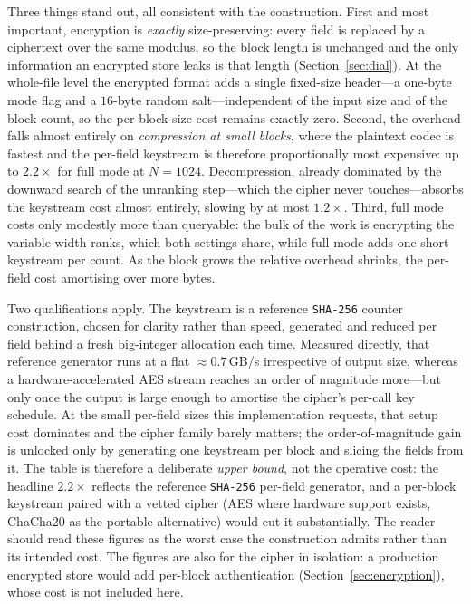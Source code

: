 \documentclass[entropy,article,submit,oneauthor,pdftex]{Definitions/mdpi}
\begin{document}
Three things stand out, all consistent with the construction. First and most
important, encryption is \emph{exactly} size-preserving: every field is replaced by a
ciphertext over the same modulus, so the block length is unchanged and the only
information an encrypted store leaks is that length
(Section~\ref{sec:dial}). At the whole-file level the encrypted format adds a single
fixed-size header---a one-byte mode flag and a $16$-byte random salt---independent of
the input size and of the block count, so the per-block size cost remains exactly
zero. Second, the overhead falls almost entirely on
\emph{compression at small blocks}, where the plaintext codec is fastest and the
per-field keystream is therefore proportionally most expensive: up to $2.2\times$ for
full mode at $N{=}1024$. Decompression, already dominated by the downward search of
the unranking step---which the cipher never touches---absorbs the keystream cost
almost entirely, slowing by at most $1.2\times$. Third, full mode costs only modestly
more than queryable: the bulk of the work is encrypting the variable-width ranks,
which both settings share, while full mode adds one short keystream per count. As the
block grows the relative overhead shrinks, the per-field cost amortising over more
bytes.

Two qualifications apply. The keystream is a reference \texttt{SHA-256}
counter construction, chosen for clarity rather than speed, generated and reduced
per field behind a fresh big-integer allocation each time. Measured directly, that
reference generator runs at a flat ${\approx}0.7$\,GB/s irrespective of output size,
whereas a hardware-accelerated AES stream reaches an order of magnitude more---but
only once the output is large enough to amortise the cipher's per-call key schedule.
At the small per-field sizes this implementation requests, that setup cost dominates
and the cipher family barely matters; the order-of-magnitude gain is unlocked only by
generating one keystream per block and slicing the fields from it. The table is
therefore a deliberate \emph{upper bound}, not the operative cost: the headline
$2.2\times$ reflects the reference \texttt{SHA-256} per-field generator, and a per-block
keystream paired with a vetted cipher (AES where hardware support exists, ChaCha20 as the
portable alternative) would cut it substantially. The reader should read these figures as
the worst case the construction admits rather than its intended cost.
The figures are also for the cipher in isolation: a production
encrypted store would add per-block authentication (Section~\ref{sec:encryption}),
whose cost is not included here.
\end{document}
